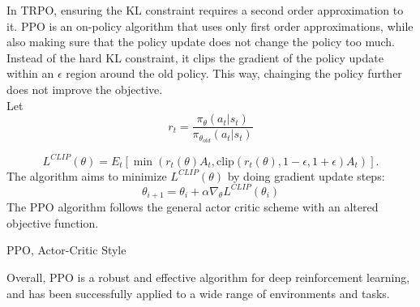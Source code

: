 In TRPO, ensuring the KL constraint requires a second order approximation to it. PPO is an on-policy algorithm that uses only first order approximations, while 
also making sure that the policy update does not change the policy too much. Instead of the hard KL constraint, it clips the gradient of the policy update within 
an $\epsilon$ region around the old policy. This way, chainging the policy further does not improve the objective.\\
Let
\begin{equation}
    r_t = \frac{\pi_{\theta}(a_t|s_t)}{\pi_{\theta_{old}}(a_t|s_t)}
\end{equation}

\begin{equation}
        L^{CLIP}(\theta) = {E}_t \left[ \min \left(r_t(\theta) {A}_t, \text{clip} \left(r_t(\theta), 1-\epsilon, 1+\epsilon \right) {A}_t \right) \right].
\end{equation}
The algorithm aims to minimize $L^{CLIP}(\theta)$ by doing gradient update steps:
\begin{equation}
    \theta_{i+1} = \theta_{i} + \alpha \nabla_{\theta} L^{CLIP}(\theta_i)
\end{equation}
The PPO algorithm follows the general actor critic scheme with an altered objective function.

\begin{algorithm}[h]
    \SetAlgoLined
    \begin{algorithmic}
        
    \end{algorithmic}
    \caption{PPO, Actor-Critic Style}\label{ppo}
\end{algorithm}

Overall, PPO is a robust and effective algorithm for deep reinforcement learning, and has been successfully applied to a wide range of environments and tasks.

